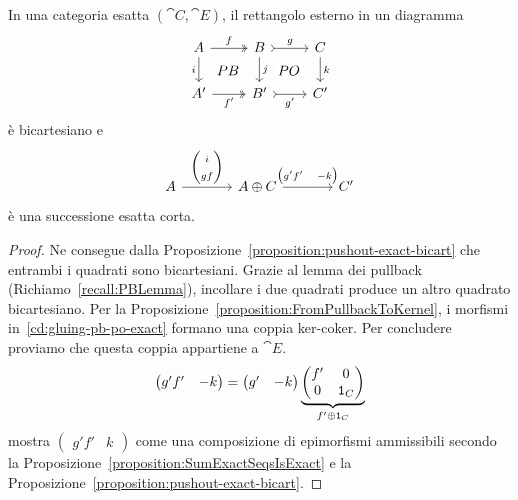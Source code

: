 \begin{corollary}
  \label{corollary:gluing-pb-po}
  In una categoria esatta \((\cat C, \cat E)\), il rettangolo esterno in
  un diagramma
  \[
    \begin{tikzcd}
      A \ar[d, "i", swap] \ar["{f}", twoheadrightarrow, r] \ar["{PB}"
      description, phantom, dr] & B \ar[d, "j"] \ar["{PO}" description,
      phantom, dr]
      \ar["{g}", rightarrowtail, r] & C \ar["{k}", d] \\
      A' \ar["{f'}", twoheadrightarrow, r, swap] & B' \ar["{g'}",
      rightarrowtail, r, swap] & C'
    \end{tikzcd}
  \]
  è bicartesiano e
  \begin{equation}
    \begin{tikzcd}[ampersand replacement=\&, column sep=large]
      A \ar[r, "{\begin{pmatrix} i \\ gf \end{pmatrix}}"] \& A \oplus C
      \ar[r, "{\begin{pmatrix} g' f' & -k \end{pmatrix}}"] \& C'
    \end{tikzcd}
    \label{cd:gluing-pb-po-exact}
  \end{equation}
  è una successione esatta corta.
\end{corollary}

\begin{proof}
  Ne consegue dalla Proposizione~\ref{proposition:pushout-exact-bicart}
  che entrambi i quadrati sono bicartesiani. Grazie al lemma dei
  pullback (Richiamo~\ref{recall:PBLemma}), incollare i due quadrati
  produce un altro quadrato bicartesiano. Per la
  Proposizione~\ref{proposition:FromPullbackToKernel}, i morfismi
  in~\eqref{cd:gluing-pb-po-exact} formano una coppia ker-coker. Per
  concludere proviamo che questa coppia appartiene a \(\cat E\).
  \[
    \begin{pmatrix}
      g' f' & -k
    \end{pmatrix}
    =
    \begin{pmatrix}
      g' & -k
    \end{pmatrix}
    \underbrace{
      \begin{pmatrix}
        f' & 0 \\
        0 & \id_C
      \end{pmatrix}
    }_{f' \oplus \id_C}
  \]
  mostra \(\begin{pmatrix} g' f' & k \end{pmatrix}\) come una
  composizione di epimorfismi ammissibili secondo la
  Proposizione~\ref{proposition:SumExactSeqsIsExact} e la
  Proposizione~\ref{proposition:pushout-exact-bicart}.
\end{proof}

